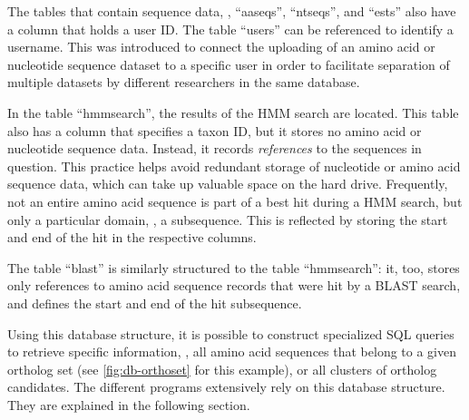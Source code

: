 The tables that contain sequence data, \ie, ``aaseqs'', ``ntseqs'', and ``ests''
also have a column that holds a user ID. The table ``users'' can be referenced
to identify a username. This was introduced to connect the uploading of an amino
acid or nucleotide sequence dataset to a specific user in order to facilitate
separation of multiple datasets by different researchers in the same database.

In the table ``hmmsearch'', the results of the HMM search are located. This
table also has a column that specifies a taxon ID, but it stores no amino acid
or nucleotide sequence data. Instead, it records \emph{references} to the
sequences in question. This practice helps avoid redundant storage of nucleotide
or amino acid sequence data, which can take up valuable space on the hard drive.
Frequently, not an entire amino acid sequence is part of a best hit during a HMM
search, but only a particular domain, \ie, a subsequence. This is reflected by
storing the start and end of the hit in the respective columns. 

The table ``blast'' is similarly structured to the table ``hmmsearch'': it, too,
stores only references to amino acid sequence records that were hit by a BLAST
search, and defines the start and end of the hit subsequence.

Using this database structure, it is possible to construct specialized SQL
queries to retrieve specific information, \eg, all amino acid sequences that
belong to a given ortholog set (see \autoref{fig:db-orthoset} for this example),
or all clusters of ortholog candidates. The different \pname programs
extensively rely on this database structure. They are explained in the following
section.




